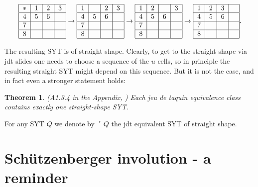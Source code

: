 \documentclass[12pt]{article}%
\newtheorem{theorem}{Theorem}
\begin{document}
\begin{equation}%
\begin{tabular}
[c]{|l|l|l|l|}\hline
$\ast$ & 1 & 2 & 3\\\hline
$4$ & 5 & 6 & \\\hline
7 &  &  & \\\hline
8 &  &  & \\\hline
\end{tabular}
\rightarrow%
\begin{tabular}
[c]{|l|l|l|l|}\hline
1 &  & 2 & 3\\\hline
$4$ & 5 & 6 & \\\hline
7 &  &  & \\\hline
8 &  &  & \\\hline
\end{tabular}
\rightarrow%
\begin{tabular}
[c]{|l|l|l|l|}\hline
1 & 2 &  & 3\\\hline
$4$ & 5 & 6 & \\\hline
7 &  &  & \\\hline
8 &  &  & \\\hline
\end{tabular}
\rightarrow%
\begin{tabular}
[c]{|l|l|l|l|}\hline
1 & 2 & 3 & $\ $\\\hline
$4$ & 5 & 6 & \\\hline
7 &  &  & \\\hline
8 &  &  & \\\hline
\end{tabular}
. \label{73}%
\end{equation}


\noindent The resulting SYT is of straight shape. Clearly, to get to the
straight shape via jdt slides one needs to choose a sequence of the $u$ cells,
so in principle the resulting straight SYT might depend on this sequence. But
it is not the case, and in fact even a stronger statement holds:

\begin{theorem}
\label{main} (A1.3.4 in the Appendix, \cite{St}) Each jeu de taquin
equivalence class contains exactly one straight-shape SYT.
\end{theorem}

For any SYT $Q$ we denote by $\mathbf{\ulcorner}Q$ the jdt equivalent SYT of
straight shape.

\section{Sch\"{u}tzenberger involution - a reminder}
\end{document}
